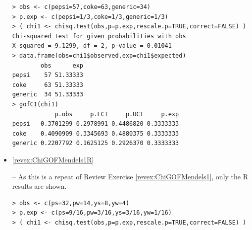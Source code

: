\documentclass[10pt,openany]{book}\usepackage[]{graphicx}\usepackage[]{color}
\makeatletter
\newenvironment{kframe}{%
 \def\at@end@of@kframe{}%
 \ifinner\ifhmode%
  \def\at@end@of@kframe{\end{minipage}}%
  \begin{minipage}{\columnwidth}%
 \fi\fi%
 \def\FrameCommand##1{\hskip\@totalleftmargin \hskip-\fboxsep
 \colorbox{shadecolor}{##1}\hskip-\fboxsep
     \hskip-\linewidth \hskip-\@totalleftmargin \hskip\columnwidth}%
 \MakeFramed {\advance\hsize-\width
   \@totalleftmargin\z@ \linewidth\hsize
   \@setminipage}}%
 {\par\unskip\endMakeFramed%
 \at@end@of@kframe}
\newenvironment{knitrout}{}{} %
\makeatother
\begin{document}
\begin{itemize}
\begin{knitrout}
\color{fgcolor}\begin{kframe}
\begin{verbatim}
> obs <- c(pepsi=57,coke=63,generic=34)
> p.exp <- c(pepsi=1/3,coke=1/3,generic=1/3)
> ( chi1 <- chisq.test(obs,p=p.exp,rescale.p=TRUE,correct=FALSE) )
Chi-squared test for given probabilities with obs 
X-squared = 9.1299, df = 2, p-value = 0.01041
> data.frame(obs=chi1$observed,exp=chi1$expected)
        obs      exp
pepsi    57 51.33333
coke     63 51.33333
generic  34 51.33333
> gofCI(chi1)
            p.obs     p.LCI     p.UCI     p.exp
pepsi   0.3701299 0.2978991 0.4486820 0.3333333
coke    0.4090909 0.3345693 0.4880375 0.3333333
generic 0.2207792 0.1625125 0.2926370 0.3333333
\end{verbatim}
\end{kframe}
\end{knitrout}
  \item \hypertarget{ans:ChiGOFMendels1R}{\ref{revex:ChiGOFMendels1R}} -- As this is a repeat of Review Exercise \ref{revex:ChiGOFMendels1}, only the R results are shown.
\begin{knitrout}
\color{fgcolor}\begin{kframe}
\begin{verbatim}
> obs <- c(ps=32,pw=14,ys=8,yw=4)
> p.exp <- c(ps=9/16,pw=3/16,ys=3/16,yw=1/16)
> ( chi1 <- chisq.test(obs,p=p.exp,rescale.p=TRUE,correct=FALSE) )
\end{verbatim}



\end{kframe}
\end{knitrout}
\end{itemize}
\end{document}
